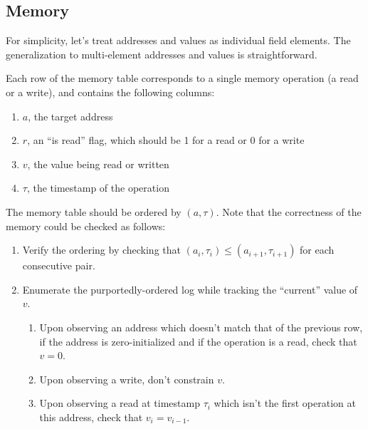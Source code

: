 \subsection{Memory}
\label{memory}

For simplicity, let's treat addresses and values as individual field elements. The generalization to multi-element addresses and values is straightforward.

Each row of the memory table corresponds to a single memory operation (a read or a write), and contains the following columns:

\begin{enumerate}
  \item $a$, the target address
  \item $r$, an ``is read'' flag, which should be 1 for a read or 0 for a write
  \item $v$, the value being read or written
  \item $\tau$, the timestamp of the operation
\end{enumerate}
The memory table should be ordered by $(a, \tau)$. Note that the correctness of the memory could be checked as follows:
\begin{enumerate}
  \item Verify the ordering by checking that $(a_i, \tau_i) \leq (a_{i+1}, \tau_{i+1})$ for each consecutive pair.
  \item Enumerate the purportedly-ordered log while tracking the ``current'' value of $v$. 
  \begin{enumerate}
    \item Upon observing an address which doesn't match that of the previous row, if the address is zero-initialized
  and if the operation is a read, check that  $v = 0$.
    \item Upon observing a write, don't constrain $v$.
    \item Upon observing a read at timestamp $\tau_i$ which isn't the first operation at this address, check that $v_i = v_{i-1}$.
  \end{enumerate}
\end{enumerate}

